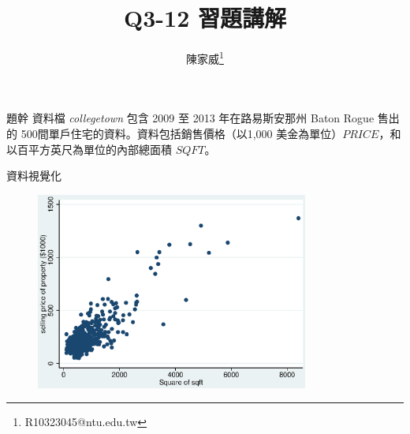 \documentclass{beamer}
\title{Q3-12 習題講解}
\author{陳家威\thanks{R10323045@ntu.edu.tw}}
\begin{document}
    \begin{frame}
        \maketitle
    \end{frame}

    \begin{frame}{題幹}
        資料檔 \emph{collegetown} 包含 2009 至 2013 年在路易斯安那州 Baton Rogue 售出的 500間單戶住宅的資料。資料包括銷售價格（以1,000 美金為單位）$PRICE$，和以百平方英尺為單位的內部總面積 $SQFT$。
    \end{frame}

    \begin{frame}{資料視覺化}
        \begin{figure}
            \includegraphics[width = 0.8\textwidth]{../Results/Visualize.eps}
        \end{figure}
    \end{frame}

    
    
    
    
\end{document}
